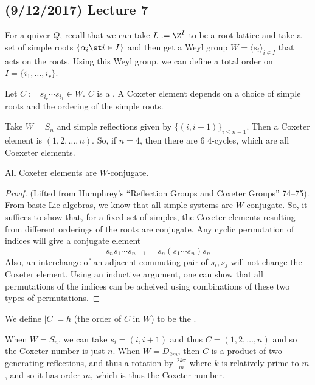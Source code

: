 \documentclass[11pt,leqno,oneside]{amsbook}
\numberwithin{thm}{section}
\renewcommand{\Q}{Q} %
\begin{document}
\subsection*{(9/12/2017) Lecture 7}
For a quiver \(\Q\), recall that we can take \(L := \Z^I\) to be a
root lattice and take a set of simple roots \(\{\alpha_i \st i \in
I\}\) and then get a Weyl group \(W = \langle s_i \rangle_{i \in
  I}\) that acts on the roots. Using this Weyl group, we can define a
total order on \(I = \{i_1, \ldots, i_r\}\).
\begin{defn}
  Let \(C := s_{i_r} \cdots s_{i_1} \in W\). \(C\) is a . A Coxeter element depends on a choice of simple
  roots and the ordering of the simple roots. 
\end{defn}
\begin{example}
  Take \(W = S_n\) and simple reflections given by \(\{(i, i+1)\}_{i
    \leq n-1}\). Then a Coxeter element is \((1, 2, \ldots, n)\). So,
  if \(n=4\), then there are \(6\) \(4\)-cycles, which are all
  Coexeter elements.
\end{example}
\begin{prop}
  All Coxeter elements are \(W\)-conjugate.
\end{prop}
\begin{proof}
  (Lifted from Humphrey's ``Reflection Groups and Coxeter Groups''
  74--75).  From basic Lie algebras, we know that all simple systems are
  \(W\)-conjugate. So, it suffices to show that, for a fixed set of
  simples, the Coxeter elements resulting from different orderings of
  the roots are conjugate. Any cyclic permutation of indices will give
  a conjugate element \[
    s_n s_1 \cdots s_{n-1} = s_n (s_1 \cdots s_n) s_n
  \]
  Also, an interchange of an adjacent commuting pair of \(s_i, s_j\)
  will not change the Coxeter element. Using an inductive argument,
  one can show that all permutations of the indices can be acheived
  using combinations of these two types of permutations.
\end{proof}
\begin{defn}
  We define \(|C| = h\) (the order of \(C\) in \(W\)) to be the
  . 
\end{defn}
\begin{example}
  When \(W = S_n\), we can take \(s_i = (i, i+1)\) and thus \(C =
  (1,2, \ldots, n)\) and so the Coxeter number is just \(n\). When \(W
  = D_{2m}\), then \(C\) is a product of two generating reflections,
  and thus a rotation by \(\frac{2 k \pi}{m}\) where \(k\) is relatively
  prime to \(m\), and so it has order \(m\), which is thus the Coxeter
  number. 
\end{example}
\end{document}
